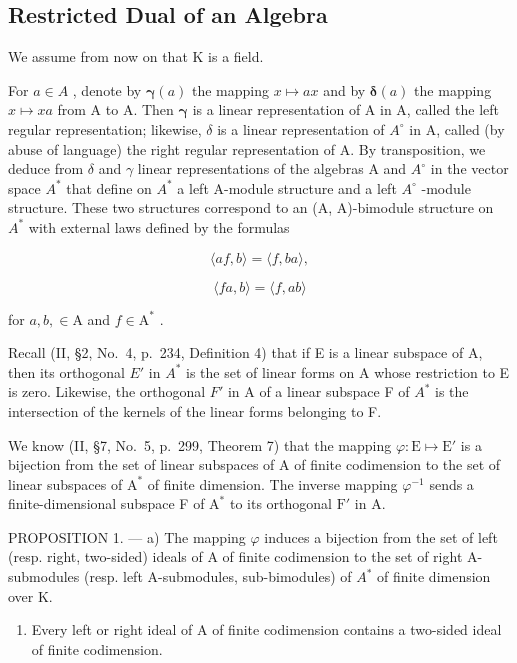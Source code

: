 \subsection{Restricted Dual of an Algebra}

We assume from now on that K is a field.

For \(a \in A\) , denote by \(\boldsymbol{\gamma}(a)\) the mapping \(x \mapsto ax\) and by \(\boldsymbol{\delta}(a)\) the mapping \(x \mapsto xa\) from A to A. Then \(\boldsymbol{\gamma}\) is a linear representation of A in A, called the left regular representation; likewise, \(\delta\) is a linear representation of \(A^{\circ}\) in A, called (by abuse of language) the right regular representation of A. By transposition, we deduce from \(\delta\) and \(\gamma\) linear representations of the algebras A and \(A^{\circ}\) in the vector space \(A^{*}\) that define on \(A^{*}\) a left A-module structure and a left \(A^{\circ}\) -module structure. These two structures correspond to an (A, A)-bimodule structure on \(A^{*}\) with external laws defined by the formulas

\[
\langle a f, b \rangle = \langle f, b a \rangle ,\tag{3}
\]

\[
\langle f a, b \rangle = \langle f, a b \rangle\tag{4}
\]

for \(a, b, \in \mathrm{A}\) and \(f \in \mathrm{A}^*\) .

Recall (II, §2, No.~4, p.~234, Definition 4) that if E is a linear subspace of A, then its orthogonal \(E'\) in \(A^{*}\) is the set of linear forms on A whose restriction to E is zero. Likewise, the orthogonal \(F'\) in A of a linear subspace F of \(A^{*}\) is the intersection of the kernels of the linear forms belonging to F.

We know (II, §7, No.~5, p.~299, Theorem 7) that the mapping \(\varphi : \mathrm{E} \mapsto \mathrm{E}'\) is a bijection from the set of linear subspaces of A of finite codimension to the set of linear subspaces of \(\mathrm{A}^*\) of finite dimension. The inverse mapping \(\varphi^{-1}\) sends a finite-dimensional subspace F of \(\mathrm{A}^*\) to its orthogonal \(\mathrm{F}'\) in A.

PROPOSITION 1. --- a) The mapping \(\varphi\) induces a bijection from the set of left (resp. right, two-sided) ideals of A of finite codimension to the set of right A-submodules (resp. left A-submodules, sub-bimodules) of \(A^{*}\) of finite dimension over K.

\begin{enumerate}
\def\labelenumi{\alph{enumi})}
\setcounter{enumi}{1}
\tightlist
\item
  Every left or right ideal of A of finite codimension contains a two-sided ideal of finite codimension.
\end{enumerate}


